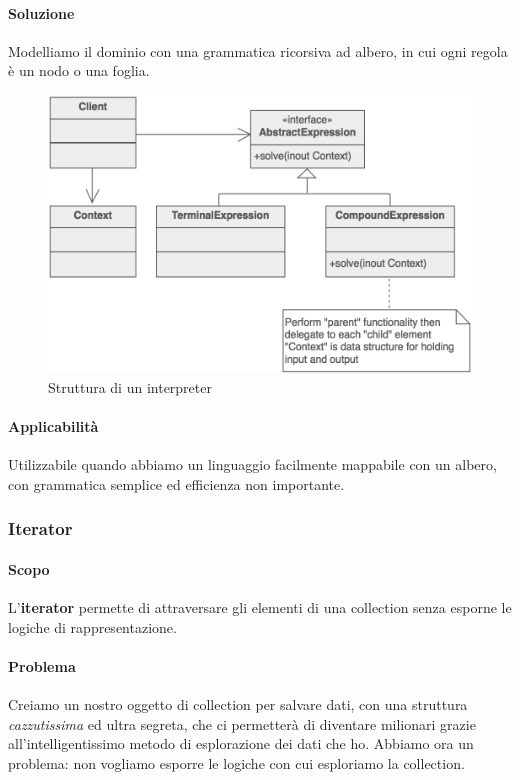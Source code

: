 \documentclass[11pt]{article}
\begin{document}
\paragraph{Soluzione}
Modelliamo il dominio con una grammatica ricorsiva ad albero, in cui ogni regola è un nodo o una foglia. 
\begin{figure}[H]
    \includegraphics[width=\linewidth]{res/teoria/Interpreter.png}
    \caption{Struttura di un interpreter}
\end{figure}
\paragraph{Applicabilità}
Utilizzabile quando abbiamo un linguaggio facilmente mappabile con un albero, con grammatica semplice ed efficienza non importante.
\subsubsection{Iterator}
\paragraph{Scopo}
L'\textbf{iterator} permette di attraversare gli elementi di una collection senza esporne le logiche di rappresentazione.
\paragraph{Problema}
Creiamo un nostro oggetto di collection per salvare dati, con una struttura \textit{cazzutissima} ed ultra segreta, che ci permetterà di diventare milionari grazie all'intelligentissimo metodo di esplorazione dei dati che ho. Abbiamo ora un problema: non vogliamo esporre le logiche con cui esploriamo la collection. 
\end{document}
